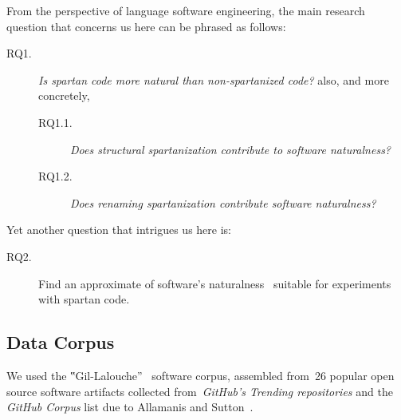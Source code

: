 From the perspective of language software engineering, the main research
question that concerns us here can be phrased as follows:
\begin{description}
  \item[RQ1.] \emph{Is spartan code more natural than non-spartanized code?} also,
        and more concretely,
        \begin{description}
          \item[RQ1.1.] \emph{Does structural spartanization contribute to software naturalness?}
          \item[RQ1.2.] \emph{Does renaming spartanization contribute software naturalness?}
        \end{description} %
\end{description} 
Yet another question that intrigues us here is:
\begin{description}
  \item[RQ2.] Find an approximate of software's
        naturalness~\cite{Hindle:Bar:Su:Gabel:Devanbu:12} suitable
        for experiments with spartan code.
\end{description}

\subsection{Data Corpus}
We used the ‟Gil-Lalouche”~\cite{Gil:Lalouche:16} software corpus,
assembled from~26 popular \Java open source software artifacts collected
from~\emph{GitHub's Trending
  repositories} and
the \emph{GitHub \Java Corpus}%
list due to Allamanis and Sutton~\cite{Allamanis:Sutton:13}.

